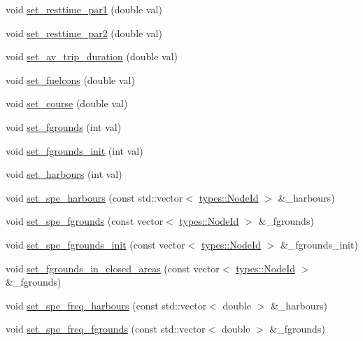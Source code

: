 \begin{DoxyCompactItemize}
void \mbox{\hyperlink{class_vessel_a5a007b0726eff322fa284a69f840ecbf}{set\+\_\+resttime\+\_\+par1}} (double val)
\item 
void \mbox{\hyperlink{class_vessel_a0bd3eb7841a73e3e80c1afc4865dabdf}{set\+\_\+resttime\+\_\+par2}} (double val)
\item 
void \mbox{\hyperlink{class_vessel_a76f916eef7f3895b4fde20b47292c615}{set\+\_\+av\+\_\+trip\+\_\+duration}} (double val)
\item 
void \mbox{\hyperlink{class_vessel_ab28d7d074d98400ba6a705114bc9c966}{set\+\_\+fuelcons}} (double val)
\item 
void \mbox{\hyperlink{class_vessel_ace602731bba3ee9d57624cb50b9f4753}{set\+\_\+course}} (double val)
\item 
void \mbox{\hyperlink{class_vessel_a769d3ff8d4f77c977f630fbd0013185b}{set\+\_\+fgrounds}} (int val)
\item 
void \mbox{\hyperlink{class_vessel_a86ee928c33c66f108bf00e0d97a69edc}{set\+\_\+fgrounds\+\_\+init}} (int val)
\item 
void \mbox{\hyperlink{class_vessel_a74602acff11603eb8b10a1d4ca387207}{set\+\_\+harbours}} (int val)
\item 
void \mbox{\hyperlink{class_vessel_a1f349b933fa117b199d6b953820a88e9}{set\+\_\+spe\+\_\+harbours}} (const std\+::vector$<$ \mbox{\hyperlink{classtypes_1_1_node_id}{types\+::\+Node\+Id}} $>$ \&\+\_\+harbours)
\item 
void \mbox{\hyperlink{class_vessel_ad05d54c9493406e442b5a4af7652fb65}{set\+\_\+spe\+\_\+fgrounds}} (const vector$<$ \mbox{\hyperlink{classtypes_1_1_node_id}{types\+::\+Node\+Id}} $>$ \&\+\_\+fgrounds)
\item 
void \mbox{\hyperlink{class_vessel_af9e60790a9ffec12d074e33a31c5dd6c}{set\+\_\+spe\+\_\+fgrounds\+\_\+init}} (const vector$<$ \mbox{\hyperlink{classtypes_1_1_node_id}{types\+::\+Node\+Id}} $>$ \&\+\_\+fgrounds\+\_\+init)
\item 
void \mbox{\hyperlink{class_vessel_a77a3040c6eded10488aba63d99bd461d}{set\+\_\+fgrounds\+\_\+in\+\_\+closed\+\_\+areas}} (const vector$<$ \mbox{\hyperlink{classtypes_1_1_node_id}{types\+::\+Node\+Id}} $>$ \&\+\_\+fgrounds)
\item 
void \mbox{\hyperlink{class_vessel_ac19e887f790ec9589e040ce0be329335}{set\+\_\+spe\+\_\+freq\+\_\+harbours}} (const std\+::vector$<$ double $>$ \&\+\_\+harbours)
\item 
void \mbox{\hyperlink{class_vessel_ad57421c8a0353286a0c9fe5e0145ef3b}{set\+\_\+spe\+\_\+freq\+\_\+fgrounds}} (const std\+::vector$<$ double $>$ \&\+\_\+fgrounds)

\end{DoxyCompactItemize}
